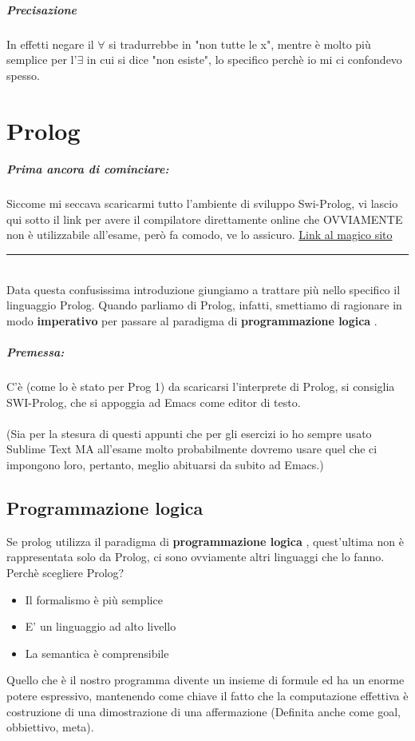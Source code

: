 \documentclass[12pt, a4paper, openany, oneside]{book}
\begin{document}
\paragraph{Precisazione} In effetti negare il $\forall$ si tradurrebbe in 
"non tutte le x", mentre è molto più semplice per l'$\exists$ in cui si dice
"non esiste", lo specifico perchè io mi ci confondevo spesso.
\chapter{Prolog}
\paragraph{Prima ancora di cominciare: } Siccome mi seccava scaricarmi tutto 
l'ambiente di sviluppo Swi-Prolog, vi lascio qui sotto il link per avere il 
compilatore direttamente online che OVVIAMENTE non è utilizzabile all'esame, 
però fa comodo, ve lo assicuro. \href{https://swish.swi-prolog.org/}
{Link al magico sito}
\\
{\color{black} \rule{\linewidth}{0.3mm} }
\\ 
Data questa confusissima introduzione giungiamo a trattare più nello specifico
il linguaggio Prolog. Quando parliamo di Prolog, infatti, smettiamo di ragionare
in modo \color{red} \textbf{imperativo} \color{black} per passare al paradigma 
di \color{red} \textbf{programmazione logica} \color{black}.
\paragraph{Premessa: }C'è (come lo è stato per Prog 1) da scaricarsi l'interprete
di Prolog, si consiglia SWI-Prolog, che si appoggia ad Emacs come editor di testo.
\\ \\
(Sia per la stesura di questi appunti che per gli esercizi io ho sempre usato
Sublime Text MA all'esame molto probabilmente dovremo usare quel che ci impongono
loro, pertanto, meglio abituarsi da subito ad Emacs.)
\section{Programmazione logica}
Se prolog utilizza il paradigma di \color{red} \textbf{programmazione logica} 
\color{black}, quest'ultima non è rappresentata solo da Prolog, ci sono ovviamente
altri linguaggi che lo fanno. Perchè scegliere Prolog?
\begin{itemize}
	\item Il formalismo è più semplice
	\item E' un linguaggio ad alto livello
	\item La semantica è comprensibile
\end{itemize}
Quello che è il nostro programma divente un \color{red} insieme di formule
\color{black} ed ha un enorme potere espressivo, mantenendo come chiave il fatto
che la computazione effettiva è costruzione di una dimostrazione di una affermazione
(Definita anche come goal, obbiettivo, meta).
\end{document}
